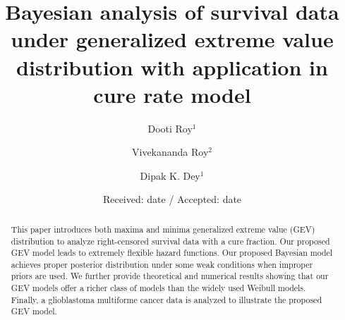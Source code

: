 \documentclass[smallextended]{svjour3}       %
\begin{document}
\title{Bayesian analysis of survival data under generalized extreme value distribution with application in cure rate model}


\author{Dooti Roy$^{1}$         \and
        Vivekananda Roy$^{2}$  \and
        Dipak K. Dey$^{1}$
}



\date{Received: date / Accepted: date}


\maketitle

\begin{abstract}
This paper introduces both maxima and minima generalized extreme value (GEV) distribution
to analyze right-censored survival data with a cure fraction. Our proposed GEV model leads to extremely flexible hazard functions. Our proposed Bayesian model achieves proper posterior distribution under some weak conditions when improper priors are used. We further provide theoretical and numerical results showing that our GEV models offer a richer class of models than the widely used Weibull models. Finally, a glioblastoma multiforme cancer data is analyzed to illustrate the proposed GEV model.
\end{abstract}
\end{document}
